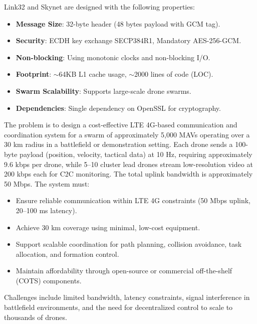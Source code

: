 \documentclass{article}
\begin{document}
Link32 and Skynet are designed with the following properties:
\begin{itemize}
    \item \textbf{Message Size}: 32-byte header (48 bytes payload with GCM tag).
    \item \textbf{Security}: ECDH key exchange SECP384R1, Mandatory AES-256-GCM.
    \item \textbf{Non-blocking}: Using monotonic clocks and non-blocking I/O.
    \item \textbf{Footprint}: $\sim$64KB L1 cache usage, $\sim$2000 lines of code (LOC).
    \item \textbf{Swarm Scalability}: Supports large-scale drone swarms.
    \item \textbf{Dependencies}: Single dependency on OpenSSL for cryptography.
\end{itemize}

The problem is to design a cost-effective LTE 4G-based communication and coordination system for a swarm of approximately 5,000 MAVs operating over a 30 km radius in a battlefield or demonstration setting. Each drone sends a 100-byte payload (position, velocity, tactical data) at 10 Hz, requiring approximately 9.6 kbps per drone, while 5--10 cluster lead drones stream low-resolution video at 200 kbps each for C2C monitoring. The total uplink bandwidth is approximately 50 Mbps. The system must:
\begin{itemize}
    \item Ensure reliable communication within LTE 4G constraints (50 Mbps uplink, 20--100 ms latency).
    \item Achieve 30 km coverage using minimal, low-cost equipment.
    \item Support scalable coordination for path planning, collision avoidance, task allocation, and formation control.
    \item Maintain affordability through open-source or commercial off-the-shelf (COTS) components.
\end{itemize}
Challenges include limited bandwidth, latency constraints, signal interference in battlefield environments, and the need for decentralized control to scale to thousands of drones.
\end{document}
